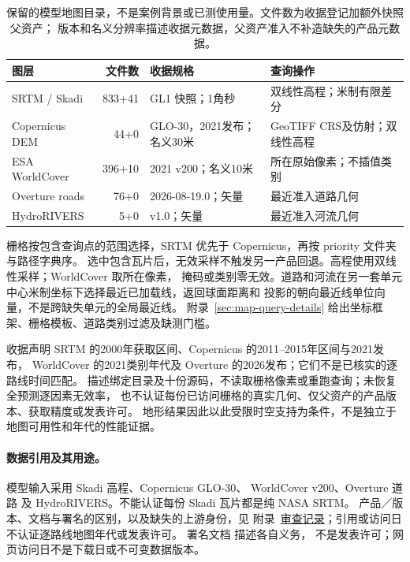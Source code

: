 \begin{table}[htbp]
\centering\footnotesize
\caption{保留的模型地图目录，不是案例背景或已测使用量。文件数为收据登记加额外快照父资产；
版本和名义分辨率描述收据元数据，父资产准入不补造缺失的产品元数据。}
\label{tab:model-map-catalog}\hypertarget{tab:model-map-catalog}{}
\begin{tabular}{@{}p{.24\linewidth}rp{.23\linewidth}p{.32\linewidth}@{}}
\toprule
图层 & 文件数 & 收据规格 & 查询操作\\
\midrule
SRTM / Skadi & 833+41 & GL1 快照；1角秒 & 双线性高程；米制有限差分\\
Copernicus DEM & 44+0 & GLO-30，2021发布；名义30米 & GeoTIFF CRS及仿射；双线性高程\\
ESA WorldCover & 396+10 & 2021 v200；名义10米 & 所在原始像素；不插值类别\\
Overture roads & 76+0 & 2026-08-19.0；矢量 & 最近准入道路几何\\
HydroRIVERS & 5+0 & v1.0；矢量 & 最近准入河流几何\\
\bottomrule
\end{tabular}
\end{table}

栅格按包含查询点的范围选择，SRTM 优先于 Copernicus，再按 priority 文件夹与路径字典序。
选中包含瓦片后，无效采样不触发另一产品回退。高程使用双线性采样；WorldCover 取所在像素，
掩码或类别零无效。道路和河流在另一套单元中心米制坐标下选择最近已加载线，返回球面距离和
投影的朝向最近线单位向量，不是跨缺失单元的全局最近线。
附录~\ref{sec:map-query-details} 给出坐标框架、栅格模板、道路类别过滤及缺测门槛。

收据声明 SRTM 的2000年获取区间、Copernicus 的2011--2015年区间与2021发布，
WorldCover 的2021类别年代及 Overture 的2026发布；它们不是已核实的逐路线时间匹配。
描述绑定目录及十份源码，不读取栅格像素或重跑查询；未恢复全预测逐因素无效率，
也不认证每份已访问栅格的真实几何、仅父资产的产品版本、获取精度或发表许可。
地形结果因此以此受限时空支持为条件，不是独立于地图可用性和年代的性能证据。

\paragraph{数据引用及其用途。}
\label{sec:data-reference-roles}\hypertarget{sec:data-reference-roles}{}
模型输入采用 Skadi 高程\cite{mapzenterrain}、Copernicus GLO-30\cite{copernicusdem2021}、
WorldCover v200\cite{worldcover2021}、Overture 道路\cite{overture202608}
及 HydroRIVERS\cite{hydrorivers2013}。不能认证每份 Skadi 瓦片都是纯 NASA SRTM。
产品／版本、文档与署名的区别，以及缺失的上游身份，见
附录~\href{audit-notes.pdf\#sec:source-reconciliation-details}{审查记录}；引用或访问日不认证逐路线地图年代或发表许可。
署名文档\cite{mapzenattribution,overtureattribution,hydroriverslicense} 描述各自义务，
不是发表许可；网页访问日不是下载日或不可变数据版本。


